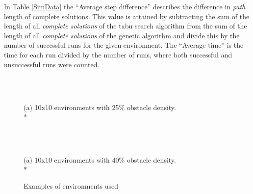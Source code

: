 In Table \ref{SimData} the ``Average step difference'' describes the difference in \emph{path} length of complete solutions. This value is attained by subtracting the sum of the length of all \emph{complete solutions} of the tabu search algorithm from the sum of the length of all \emph{complete solutions} of the genetic algorithm and divide this by the number of successful runs for the given environment. The ``Average time'' is the time for each run divided by the number of runs, where both successful and unsuccessful runs were counted.
\begin{center}
\begin{table}[t!hb]
\noindent{}
\caption{Data from simulations.}
\label{SimData}
\end{table}
\end{center}
\begin{figure}[t!hb]
\begin{center}
\begin{tabular}{| p{0.1cm} | p{0.1cm} | p{0.1cm} | p{0.1cm} | p{0.1cm} | p{0.1cm} | p{0.1cm} | p{0.1cm} | p{0.1cm} | p{0.1cm} | }
\hline
 
\hline
\end{tabular}
\hspace{0.5cm}
\begin{tabular}{| p{0.1cm} | p{0.1cm} | p{0.1cm} | p{0.1cm} | p{0.1cm} | p{0.1cm} | p{0.1cm} | p{0.1cm} | p{0.1cm} | p{0.1cm} | }
\hline
 
\hline
\end{tabular}
\vspace{0.1cm}\\(a) 10x10 environments with 25\% obstacle density.\\*
\end{center}
\vspace{0.05cm}
\begin{center}
\begin{tabular}{| p{0.1cm} | p{0.1cm} | p{0.1cm} | p{0.1cm} | p{0.1cm} | p{0.1cm} | p{0.1cm} | p{0.1cm} | p{0.1cm} | p{0.1cm} | }
\hline
 
\hline
\end{tabular}
\hspace{0.5cm}
\begin{tabular}{| p{0.1cm} | p{0.1cm} | p{0.1cm} | p{0.1cm} | p{0.1cm} | p{0.1cm} | p{0.1cm} | p{0.1cm} | p{0.1cm} | p{0.1cm} | }
\hline
 
\hline
\end{tabular}
\vspace{0.1cm}\\(a) 10x10 environments with 40\% obstacle density.\\*
\caption{Examples of environments used}
\end{center}
\label{Envs}
\end{figure}
